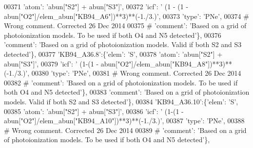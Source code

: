 \begin{DoxyCode}
00371                                      \textcolor{stringliteral}{'atom'}: \textcolor{stringliteral}{'abun["S2"] + abun["S3"]'},
00372                                      \textcolor{stringliteral}{'icf'}: \textcolor{stringliteral}{' (1 - (1 - abun["O2"]/elem\_abun["KB94\_A6"])**3)**(-1./3.)'},
00373                                       \textcolor{stringliteral}{'type'}: \textcolor{stringliteral}{'PNe'},
00374 \textcolor{comment}{# Wrong comment. Corrected 26 Dec 2014}
00375 \textcolor{comment}{#                                      'comment': 'Based on a grid of photoionization models. To be used if
       both O4 and N5 detected'\},}
00376                                       \textcolor{stringliteral}{'comment'}: \textcolor{stringliteral}{'Based on a grid of photoionization models. Valid if both
       S2 and S3 detected'}\},
00377                          \textcolor{stringliteral}{'KB94\_A36.8'}:\{\textcolor{stringliteral}{'elem'}: \textcolor{stringliteral}{'S'},
00378                                      \textcolor{stringliteral}{'atom'}: \textcolor{stringliteral}{'abun["S2"] + abun["S3"]'},
00379                                      \textcolor{stringliteral}{'icf'}: \textcolor{stringliteral}{' (1-(1 - abun["O2"]/elem\_abun["KB94\_A8"])**3)**(-1./3.)'},
00380                                       \textcolor{stringliteral}{'type'}: \textcolor{stringliteral}{'PNe'},
00381 \textcolor{comment}{# Wrong comment. Corrected 26 Dec 2014}
00382 \textcolor{comment}{#                                      'comment': 'Based on a grid of photoionization models. To be used if
       both O4 and N5 detected'\},}
00383                                       \textcolor{stringliteral}{'comment'}: \textcolor{stringliteral}{'Based on a grid of photoionization models. Valid if both
       S2 and S3 detected'}\},
00384                          \textcolor{stringliteral}{'KB94\_A36.10'}:\{\textcolor{stringliteral}{'elem'}: \textcolor{stringliteral}{'S'},
00385                                      \textcolor{stringliteral}{'atom'}: \textcolor{stringliteral}{'abun["S2"] + abun["S3"]'},
00386                                      \textcolor{stringliteral}{'icf'}: \textcolor{stringliteral}{' (1-(1 - abun["O2"]/elem\_abun["KB94\_A10"])**3)**(-1./3.)'},
00387                                       \textcolor{stringliteral}{'type'}: \textcolor{stringliteral}{'PNe'},
00388 \textcolor{comment}{# Wrong comment. Corrected 26 Dec 2014}
00389 \textcolor{comment}{#                                      'comment': 'Based on a grid of photoionization models. To be used if
       both O4 and N5 detected'\},}

\end{DoxyCode}
